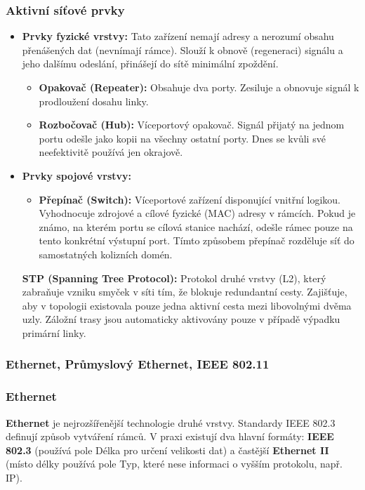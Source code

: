         \subsubsection*{Aktivní síťové prvky}
            \begin{itemize}
                \item\textbf{Prvky fyzické vrstvy:} Tato zařízení nemají adresy a nerozumí obsahu přenášených dat (nevnímají rámce). Slouží k obnově (regeneraci) signálu a jeho dalšímu odeslání, přinášejí do sítě minimální zpoždění.
                \begin{itemize}
                    \item \textbf{Opakovač (Repeater):} Obsahuje dva porty. Zesiluje a obnovuje signál k prodloužení dosahu linky.
                    \item \textbf{Rozbočovač (Hub):} Víceportový opakovač. Signál přijatý na jednom portu odešle jako kopii na všechny ostatní porty. Dnes se kvůli své neefektivitě používá jen okrajově.
                \end{itemize}
                \item\textbf{Prvky spojové vrstvy:}
                \begin{itemize}
                    \item \textbf{Přepínač (Switch):} Víceportové zařízení disponující vnitřní logikou. Vyhodnocuje zdrojové a cílové fyzické (MAC) adresy v rámcích. Pokud je známo, na kterém portu se cílová stanice nachází, odešle rámec pouze na tento konkrétní výstupní port. Tímto způsobem přepínač rozděluje síť do samostatných kolizních domén.
                \end{itemize}
                    \textbf{STP (Spanning Tree Protocol):} Protokol druhé vrstvy (L2), který zabraňuje vzniku smyček v síti tím, že blokuje redundantní cesty. Zajišťuje, aby v topologii existovala pouze jedna aktivní cesta mezi libovolnými dvěma uzly. Záložní trasy jsou automaticky aktivovány pouze v případě výpadku primární linky.
            \end{itemize}

        \subsubsection{Ethernet, Průmyslový Ethernet, IEEE 802.11}
            
            
                \subsubsection*{Ethernet}
                \textbf{Ethernet} je nejrozšířenější technologie druhé vrstvy. Standardy IEEE 802.3 definují způsob vytváření rámců. V praxi existují dva hlavní formáty: \textbf{IEEE 802.3} (používá pole Délka pro určení velikosti dat) a častější \textbf{Ethernet II} (místo délky používá pole Typ, které nese informaci o vyšším protokolu, např. IP).
                

